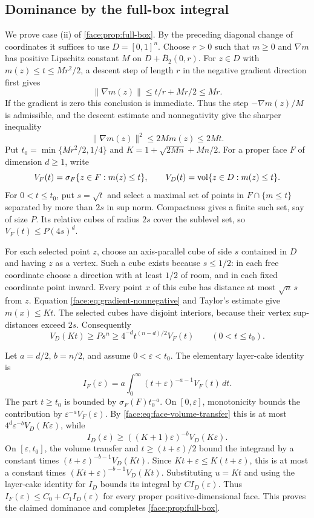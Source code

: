 \subsection{Dominance by the full-box integral}
\label{app:face:full-box}

We prove case (ii) of \cref{face:prop:full-box}.  By the preceding
diagonal change of coordinates it suffices to use $D=[0,1]^n$.
Choose $r>0$ such that $m\ge0$ and $\nabla m$ has positive Lipschitz
constant $M$ on $D+\overline B_2(0,r)$.  For $z\in D$ with
$m(z)\le t\le Mr^2/2$, a descent step of length $r$ in the negative
gradient direction first gives
\[
 \|\nabla m(z)\|\le t/r+Mr/2\le Mr.
\]
If the gradient is zero this conclusion is immediate.
Thus the step $-\nabla m(z)/M$ is admissible, and the descent estimate
and nonnegativity give the sharper inequality
\begin{equation}
 \label{face:eq:gradient-nonnegative}
 \|\nabla m(z)\|^2\le2Mm(z)\le2Mt.
\end{equation}
Put $t_0=\min\{Mr^2/2,1/4\}$ and $K=1+\sqrt{2Mn}+Mn/2$.
For a proper face $F$ of dimension $d\ge1$, write
\[
 V_F(t)=\sigma_F\{z\in F:m(z)\le t\},\qquad
 V_D(t)=\operatorname{vol}\{z\in D:m(z)\le t\}.
\]
For $0<t\le t_0$, put $s=\sqrt t$ and select a maximal set of points
in $F\cap\{m\le t\}$ separated by more than $2s$ in sup norm.
Compactness gives a finite such set, say of size $P$.
Its relative cubes of radius $2s$ cover the sublevel set, so
$V_F(t)\le P(4s)^d$.

For each selected point $z$, choose an axis-parallel cube of side
$s$ contained in $D$ and having $z$ as a vertex.  Such a cube exists
because $s\le1/2$: in each free coordinate choose a direction with
at least $1/2$ of room, and in each fixed coordinate point inward.
Every point $x$ of this cube has distance at most $\sqrt n\,s$ from
$z$.  Equation \eqref{face:eq:gradient-nonnegative} and Taylor's
estimate give $m(x)\le Kt$.
The selected cubes have disjoint interiors, because their vertex
sup-distances exceed $2s$.  Consequently
\begin{equation}
 \label{face:eq:face-volume-transfer}
 V_D(Kt)\ge P s^n
 \ge4^{-d}t^{(n-d)/2}V_F(t)
 \qquad(0<t\le t_0).
\end{equation}

Let $a=d/2$, $b=n/2$, and assume $0<\varepsilon<t_0$.
The elementary layer-cake identity is
\[
 I_F(\varepsilon)
 =a\int_0^\infty(t+\varepsilon)^{-a-1}V_F(t)\,dt.
\]
The part $t\ge t_0$ is bounded by $\sigma_F(F)t_0^{-a}$.
On $[0,\varepsilon]$, monotonicity bounds the contribution by
$\varepsilon^{-a}V_F(\varepsilon)$.  By
\eqref{face:eq:face-volume-transfer} this is at most
$4^d\varepsilon^{-b}V_D(K\varepsilon)$, while
\[
 I_D(\varepsilon)
 \ge((K+1)\varepsilon)^{-b}V_D(K\varepsilon).
\]
On $[\varepsilon,t_0]$, the volume transfer and
$t\ge(t+\varepsilon)/2$ bound the integrand by a constant times
$(t+\varepsilon)^{-b-1}V_D(Kt)$.
Since $Kt+\varepsilon\le K(t+\varepsilon)$, this is at most a
constant times $(Kt+\varepsilon)^{-b-1}V_D(Kt)$.
Substituting $u=Kt$ and using the layer-cake identity for $I_D$
bounds its integral by $C I_D(\varepsilon)$.
Thus $I_F(\varepsilon)\le C_0+C_1 I_D(\varepsilon)$ for every proper
positive-dimensional face.  This proves the claimed dominance and
completes \cref{face:prop:full-box}.
